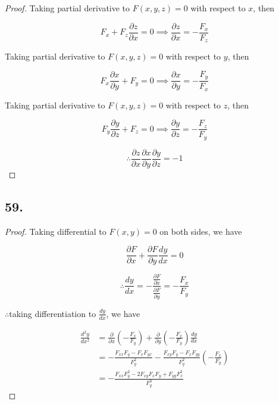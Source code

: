 \documentclass{article}
\begin{document}
    \begin{proof}

        Taking partial derivative to $F(x, y, z) = 0$ with  respect to $x$, then

        $$F_x+F_z\frac{\partial z}{\partial x} = 0 \implies \frac{\partial z}{\partial x} = -\frac{F_x}{F_z}$$

        Taking partial derivative to $F(x, y, z) = 0$ with  respect to $y$, then

        $$F_x\frac{\partial x}{\partial y} + F_y = 0 \implies \frac{\partial x}{\partial y} = -\frac{F_y}{F_x}$$

        Taking partial derivative to $F(x, y, z) = 0$ with  respect to $z$, then

        $$F_y\frac{\partial y}{\partial z} + F_z = 0 \implies \frac{\partial y}{\partial z} = -\frac{F_z}{F_y}$$

        $$\therefore \frac{\partial z}{\partial x}\frac{\partial x}{\partial y}\frac{\partial y}{\partial z} = -1$$

    \end{proof}

    \subsection*{59. }

    \begin{proof}
        Taking differential to $F(x, y) = 0$ on both sides, we have

        $$\frac{\partial F}{\partial x} + \frac{\partial F}{\partial y}\frac{dy}{dx} = 0$$

        $$\therefore \frac{dy}{dx} = -\frac{\frac{\partial F}{\partial x}}{\frac{\partial F}{\partial y}} = -\frac{F_x}{F_y}$$

        $\therefore$taking differentiation to $\frac{dy}{dx}$, we have

        $$\begin{aligned}
            \frac{d^2y}{dx^2} &= \frac{\partial}{\partial x}(-\frac{F_x}{F_y}) + \frac{\partial}{\partial y}(-\frac{F_x}{F_y})\frac{dy}{dx} \\
            &= -\frac{F_{xx}F_y - F_xF_{yx}}{F_y^2} - \frac{F_{xy}F_y - F_{x}F_{yy}}{F_y^2}(-\frac{F_x}{F_y}) \\
            &= -\frac{F_{xx}F_y^2 - 2F_{xy}F_xF_y + F_{yy}F_x^2}{F_y^3}
        \end{aligned}$$
    \end{proof}
\end{document}
